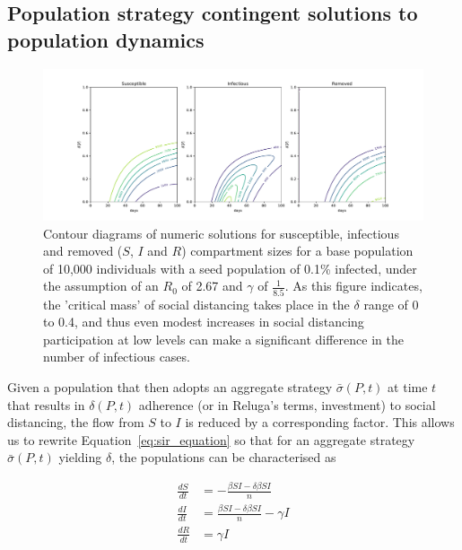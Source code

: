 \documentclass[12pt]{article}
\begin{document}

\subsection{Population strategy contingent solutions to population dynamics} %
\label{sub:population_strategy_contingent_solutions_to_population_dynamics}

\begin{figure}
	\includegraphics[width=\linewidth]{figures/fig3-SIR-by-delta}
	\caption{Contour diagrams of numeric solutions for susceptible, infectious and removed ($S$, $I$ and $R$) compartment sizes for a base population of 10,000 individuals with a seed population of 0.1\% infected, under the assumption of an $R_0$ of 2.67 and $\gamma$ of $\frac{1}{8.5}$. As this figure indicates, the 'critical mass' of social distancing takes place in the $\delta$ range of 0 to 0.4, and thus even modest increases in social distancing participation at low levels can make a significant difference in the number of infectious cases.}
	\label{fig:fig3-SIR-by-delta}
\end{figure}

Given a population that then adopts an aggregate strategy $\bar{\sigma}(P, t)$ at time $t$ that results in $\delta(P, t)$ adherence (or in Reluga's terms, investment\cite{reluga2010game}) to social distancing, the flow from $S$ to $I$ is reduced by a corresponding factor. This allows us to rewrite Equation~\eqref{eq:sir_equation} so that for an aggregate strategy $\bar{\sigma}(P, t)$ yielding $\delta$, the populations can be characterised as

\begin{equation}
	\begin{aligned}
		\frac{dS}{dt} &= - \frac{\beta S I - \delta \beta S I}{n} 			\\
		\frac{dI}{dt} &= \frac{\beta S I - \delta \beta S I}{n} - \gamma I	\\
		\frac{dR}{dt} &= \gamma I
	\end{aligned}
	\label{eq:sir_with_social_distancing}
\end{equation}
\end{document}
